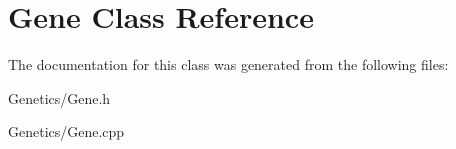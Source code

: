 \hypertarget{class_gene}{}\section{Gene Class Reference}
\label{class_gene}


The documentation for this class was generated from the following files\+:\begin{DoxyCompactItemize}
\item 
Genetics/Gene.\+h\item 
Genetics/Gene.\+cpp\end{DoxyCompactItemize}
